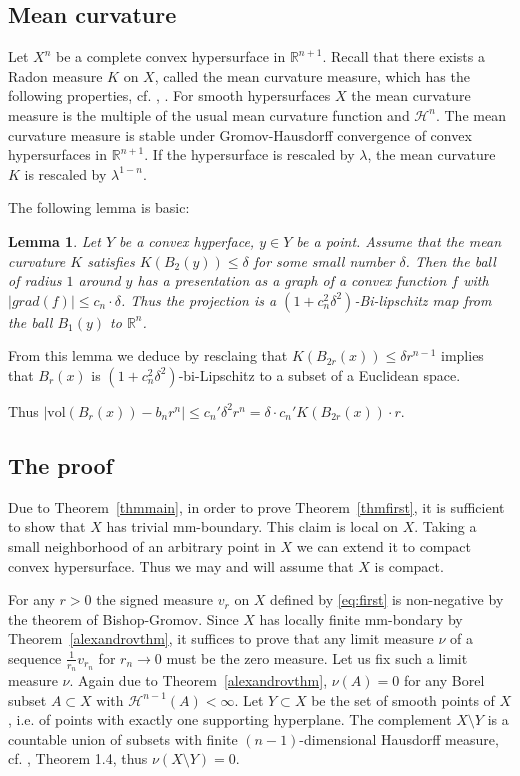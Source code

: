 \documentclass[12pt,leqno]{amsart}
\numberwithin{equation}{section}
\newtheorem{lem}[thm]{Lemma}
\theoremstyle{definition}
\theoremstyle{remark}
\newcommand{\tref}[1]{Theorem~\ref{#1}}
\newcommand{\vol}{\mathrm{vol}}
\newcommand{\R}{\mathbb{R}}
\begin{document}
\subsection{Mean curvature}
Let $X^n$ be a complete convex hypersurface in $\R ^{n+1}$.  Recall that there exists a Radon measure $K$ on $X$, called the mean curvature measure, which has the following properties, cf. \cite{Schneider}, \cite{Fedcurvature}.
For smooth hypersurfaces $X$ the mean curvature measure is the multiple of the usual mean curvature function and $\mathcal H^n$.  The mean curvature measure is stable under Gromov-Hausdorff convergence of convex hypersurfaces in $\R^{n+1}$. If the hypersurface is rescaled by $\lambda$, the mean curvature $K$ is rescaled by $\lambda ^{1-n}$.









The following lemma is basic:

\begin{lem}
Let $Y$ be a convex hyperface, $y\in Y$ be a point. Assume that the mean curvature $K$ satisfies $K(B_2 (y) ) \leq \delta $ for some small number $\delta$.  Then the ball of radius $1$ around $y$ has a presentation as a graph of a convex function $f$ with $|grad (f)|  \leq c_n \cdot \delta $.
 Thus the projection is a $(1+c_n ^2 \delta ^2)$-Bi-lipschitz map from the
ball $B_1 (y)$ to $\R ^n$.
\end{lem}


  From this lemma we deduce by resclaing that $K(B_{2r} (x)) \leq \delta r^{n-1}$
implies that $B_r (x)$ is $(1+ c_n ^2 \delta ^2)$-bi-Lipschitz to a subset of a Euclidean space.

 Thus $|\vol (B_r (x)) - b_n r^n| \leq  c_n '\delta ^2 r ^n = \delta \cdot  c_n '
K (B_{2r} (x)) \cdot r$.


\subsection{The proof}
Due to \tref{thmmain}, in order to prove \tref{thmfirst}, it is sufficient to show that $X$ has trivial mm-boundary. This claim is local on $X$.
Taking a small neighborhood of an arbitrary point in $X$ we can extend it to compact convex hypersurface. Thus we may and will assume that $X$
is compact.


For any $r>0$ the signed measure $v_r$ on $X$ defined by \eqref{eq:first} is non-negative by the theorem of Bishop-Gromov.  Since $X$ has locally finite mm-bondary by
\tref{alexandrovthm}, it suffices to prove that  any limit measure $\nu$ of a sequence $\frac 1 {r_n} v_{r_n}$ for $r_n\to 0$ must be the zero measure.
Let us fix such a limit measure $\nu$.  Again due to \tref{alexandrovthm}, $\nu (A)=0$ for any Borel subset $A\subset X$ with $\mathcal H^{n-1} (A)<\infty$.
Let $Y\subset X$ be the set of smooth points of $X$, i.e. of points with exactly one supporting hyperplane.
The complement $X\setminus Y$ is a countable union of subsets with finite $(n-1)$-dimensional Hausdorff measure, cf. \cite{Schneider}, Theorem 1.4, thus $\nu (X\setminus Y) =0$.
\end{document}

